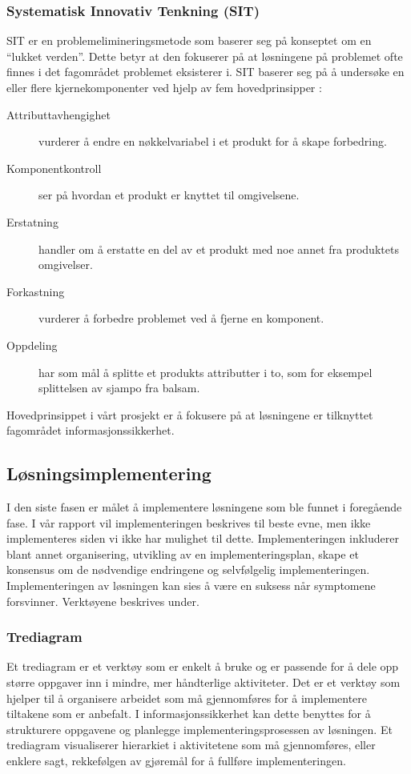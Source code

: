 \subsubsection{Systematisk Innovativ Tenkning (SIT)}
SIT er en problemelimineringsmetode som baserer seg på konseptet om en ``lukket verden''. Dette betyr at den fokuserer på at løsningene på problemet ofte finnes i det fagområdet problemet eksisterer i. SIT baserer seg på å undersøke en eller flere kjernekomponenter ved hjelp av fem hovedprinsipper \cite{RCA}: 

\begin{description}
    \item[Attributtavhengighet] vurderer å endre en nøkkelvariabel i et produkt for å skape forbedring.
    \item[Komponentkontroll] ser på hvordan et produkt er knyttet til omgivelsene.
    \item[Erstatning] handler om å erstatte en del av et produkt med noe annet fra produktets omgivelser.
    \item[Forkastning] vurderer å forbedre problemet ved å fjerne en komponent. 
    \item[Oppdeling] har som mål å splitte et produkts attributter i to, som for eksempel splittelsen av sjampo fra balsam.
\end{description}

Hovedprinsippet i vårt prosjekt er å fokusere på at løsningene er tilknyttet fagområdet informasjonssikkerhet.

\subsection{Løsningsimplementering}
I den siste fasen er målet å implementere løsningene som ble funnet i foregående fase. I vår rapport vil implementeringen beskrives til beste evne, men ikke implementeres siden vi ikke har mulighet til dette. Implementeringen inkluderer blant annet organisering, utvikling av en implementeringsplan, skape et konsensus om de nødvendige endringene og selvfølgelig implementeringen. Implementeringen av løsningen kan sies å være en suksess når symptomene forsvinner. Verktøyene beskrives under.

\subsubsection{Trediagram}
Et trediagram er et verktøy som er enkelt å bruke og er passende for å dele opp større oppgaver inn i mindre, mer håndterlige aktiviteter. Det er et verktøy som hjelper til å organisere arbeidet som må gjennomføres for å implementere tiltakene som er anbefalt. I informasjonssikkerhet kan dette benyttes for å strukturere oppgavene og planlegge implementeringsprosessen av løsningen. Et trediagram visualiserer hierarkiet i aktivitetene som må gjennomføres, eller enklere sagt, rekkefølgen av gjøremål for å fullføre implementeringen. 

